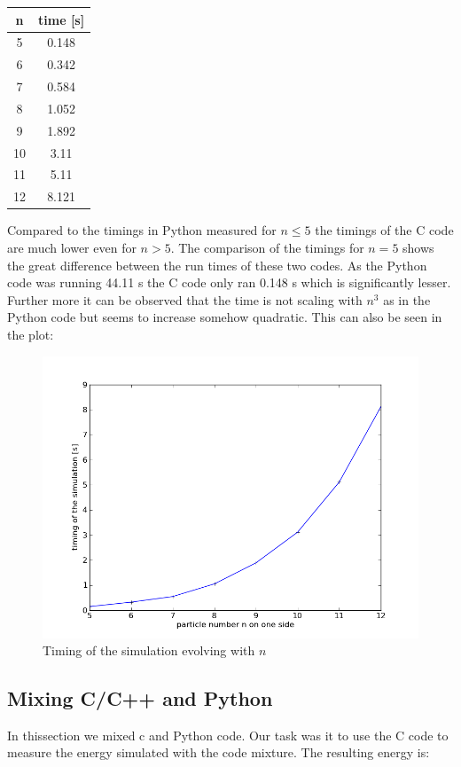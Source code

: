\documentclass[12pt,a4paper]{scrartcl}
\begin{document}
\begin{center}
\begin{tabular}{c c}\toprule
n&time [s]\\ \midrule
5&0.148\\
6&0.342\\
7&0.584\\ 
8&1.052\\
9&1.892\\
10&3.11\\
11&5.11\\
12&8.121\\ \bottomrule
\end{tabular}
\end{center}
Compared to the timings in Python measured for $n\le5$ the timings of the C code are much lower even for $n>5$. 
The comparison of the timings for $n=5$ shows the great difference between the run times of these two codes.
As the Python code was running 44.11 s the C code only ran 0.148 s which is significantly lesser.
Further more it can be observed that the time is not scaling with $n^3$ as in the Python code but seems to increase somehow quadratic. This can also be seen in the plot:
\begin{figure}[H]
\centering
\includegraphics[width=12.0cm]{../plots/timing.png}
\caption{Timing of the simulation evolving with $n$}
\label{fig:Timing of the simulation}
\end{figure}

\subsection{Mixing C/C++ and Python}
In thissection we mixed c and Python code. Our task was it to use the C code to measure the energy simulated with the code mixture. The resulting energy is:
\end{document}
